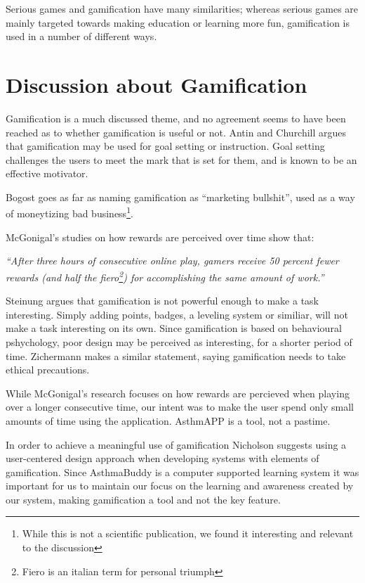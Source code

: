 Serious games and gamification have many similarities; whereas serious games are mainly targeted towards making education or learning more fun, gamification is used in a number of different ways. 


\section{Discussion about Gamification}
\label{sec:gamificationdiscussion}

Gamification is a much discussed theme, and no agreement seems to have been reached as to whether gamification is useful or not. 
Antin and Churchill argues that gamification may be used for goal setting or instruction\cite{antin2011badges}. Goal setting challenges the users to meet the mark that is set for them, and is known to be an effective motivator\cite{ling2005using}. 

Bogost goes as far as naming gamification as ``marketing bullshit'', used as a way of moneytizing bad business\cite{gamificationbullshit}\footnote{While this is not a scientific publication, we found it interesting and relevant to the discussion}.

McGonigal's studies on how rewards are perceived over time show that: 

\textit{``After three hours of consecutive online play, gamers receive 50 percent fewer rewards (and half the fiero\footnote{Fiero is an italian term for personal triumph\cite{ekman2007emotions}}) for accomplishing the same amount of work.''}\cite{jane2011reality}

Steinung argues that gamification is not powerful enough to make a task interesting\cite{steinung2012interessante}. Simply adding points, badges, a leveling system or similiar, will not make a task interesting on its own. Since gamification is based on behavioural pshychology, poor design may be perceived as interesting, for a shorter period of time\cite{steinung2012interessante}. Zichermann makes a similar statement, saying gamification needs to take ethical precautions\cite{zichermann2011gamification}.

While McGonigal's research focuses on how rewards are percieved when playing over a longer consecutive time, our intent was to make the user spend only small amounts of time using the application. AsthmAPP is a tool, not a pastime.

In order to achieve a meaningful use of gamification Nicholson\cite{nicholson2012user} suggests using a user-centered design approach\cite{usercentereddesign} when developing systems with elements of gamification. Since AsthmaBuddy is a computer supported learning system\cite{stahl2006computer} it was important for us to maintain our focus on the learning and awareness created by our system, making gamification a tool and not the key feature.

